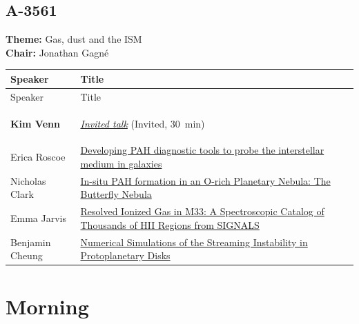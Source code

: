 \subsection*{A-3561}
\textbf{Theme:} Gas, dust and the ISM\\
\textbf{Chair:} Jonathan Gagné\\
{\small
{}
\sloppy
\setlength{\emergencystretch}{1em}
\begin{longtable}{@{}>{\TableRaggedRight\arraybackslash\hspace{0pt}}p{} >{\TableRaggedRight\arraybackslash\hspace{0pt}}p{}@{}}
\toprule
Speaker & Title \\
\midrule
\endfirsthead
\toprule
Speaker & Title \\
\midrule
\endhead
\hypertarget{invited-kim-venn-sched}{}\label{invited-page-kim-venn-sched}{\bfseries\color{cascagold}Kim Venn} & \hyperlink{invited-kim-venn}{\emph{Invited talk}} {\small\color{cascagold}(Invited, 30~min)} \\
\hypertarget{schedule-talk-289}{}\label{schedule-page-talk-289}Erica Roscoe & \hyperlink{abstract-talk-289}{Developing PAH diagnostic tools to probe the interstellar medium in galaxies} \\
\hypertarget{schedule-talk-113}{}\label{schedule-page-talk-113}Nicholas Clark & \hyperlink{abstract-talk-113}{In-situ PAH formation in an O-rich Planetary Nebula: The Butterfly Nebula} \\
\hypertarget{schedule-talk-154}{}\label{schedule-page-talk-154}Emma Jarvis & \hyperlink{abstract-talk-154}{Resolved Ionized Gas in M33: A Spectroscopic Catalog of Thousands of HII Regions from SIGNALS} \\
\hypertarget{schedule-talk-260}{}\label{schedule-page-talk-260}Benjamin Cheung & \hyperlink{abstract-talk-260}{Numerical Simulations of the Streaming Instability in Protoplanetary Disks} \\
\bottomrule
\end{longtable}
}

\hypertarget{schedule-day-wednesday}{}

\hypertarget{schedule-wednesday-morning}{}
\section*{Morning}

\hypertarget{schedule-wednesday-morning-a-1502}{}
